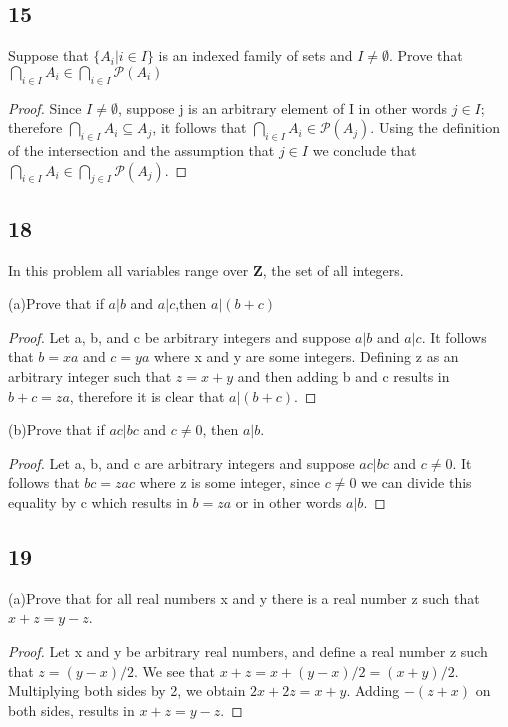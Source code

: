 \documentclass{article}
\begin{document}
\subsection{15}
Suppose that $\{ A_{i} | i\in I\}$ is an indexed family of sets and $I \neq \emptyset$.  Prove that $\bigcap_{i\in I}A_{i} \in \bigcap_{i \in I} \mathscr{P}(A_i)$
\begin{proof}Since $I \neq \emptyset$, suppose j is an arbitrary element of I in other words $j \in I$; therefore $\bigcap_{i \in I}A_{i}\subseteq A_{j}$, it follows that $\bigcap_{i \in I}A_{i}\in \mathscr{P}(A_{j})$. Using the definition of the intersection and the assumption that $j \in I$ we conclude that $\bigcap_{i \in I}A_{i}\in \bigcap_{j\in I}\mathscr{P}(A_{j})$.
\end{proof}
\subsection{18}
In this problem all variables range over $\mathbf{Z}$, the set of all integers.

(a)Prove that if $a|b$ and $a|c$,then $a|(b+c)$
\begin{proof}
Let a, b, and c be arbitrary integers and suppose $a|b$ and $a|c$. It follows that $b=xa$ and $c=ya$ where x and y are some integers. Defining z as an arbitrary integer such that $z=x+y$ and then adding b and c results in $b+c=za$, therefore it is clear that  $a|(b+c)$. 
\end{proof}

(b)Prove that if $ac|bc$ and $c\neq 0$, then $a|b$.
\begin{proof}
Let a, b, and c are arbitrary integers and suppose $ac|bc$ and $c\neq 0$. It follows that $bc=zac$ where z is some integer, since $c\neq0$ we can divide this equality by c which results in  $b=za$ or in other words $a|b$. 
\end{proof}
\subsection{19}

(a)Prove that for all real numbers x and y there is a real number z such that $x +z = y-z$.

\begin{proof}
Let x and y be arbitrary real numbers, and define a real number z such that $z=(y-x)/2$. We see that $x+z = x+(y-x)/2=(x+y)/2$. Multiplying both sides by 2, we obtain $2x+2z=x+y$. Adding $-(z+x)$ on both sides, results in $x+z=y-z$.
\end{proof}
\end{document}
